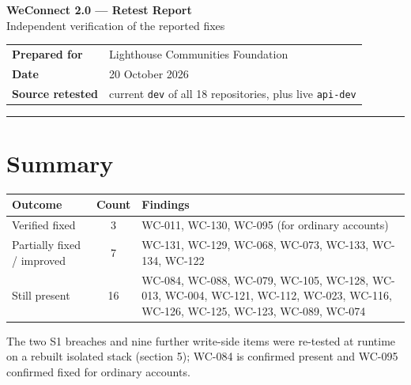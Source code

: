 \documentclass[11pt]{article}
\newcommand{\wc}[1]{\mbox{WC-#1}}
\begin{document}
\justifying

\begin{center}
{\LARGE\bfseries WeConnect 2.0 --- Retest Report}\\[4pt]
{\large Independent verification of the reported fixes}\\[10pt]
\end{center}

\begin{tabular}{@{}ll@{}}
\textbf{Prepared for} & Lighthouse Communities Foundation \\
\textbf{Date} & 20 October 2026 \\
\textbf{Source retested} & current \texttt{dev} of all 18 repositories, plus live \texttt{api-dev} \\
\end{tabular}

\vspace{3pt}\hrule\vspace{2pt}

\section{Summary}
\begin{tabularx}{\textwidth}{@{}lcL@{}}
\toprule
\textbf{Outcome} & \textbf{Count} & \textbf{Findings} \\
\midrule
Verified fixed & 3 & \wc{011}, \wc{130}, \wc{095} (for ordinary accounts) \\
Partially fixed / improved & 7 & \wc{131}, \wc{129}, \wc{068}, \wc{073}, \wc{133}, \wc{134}, \wc{122} \\
Still present & 16 & \wc{084}, \wc{088}, \wc{079}, \wc{105}, \wc{128}, \wc{013}, \wc{004}, \wc{121}, \wc{112}, \wc{023}, \wc{116}, \wc{126}, \wc{125}, \wc{123}, \wc{089}, \wc{074} \\
\bottomrule
\end{tabularx}

\vspace{2pt}
The two S1 breaches and nine further write-side items were re-tested at runtime on a rebuilt
isolated stack (section 5); \wc{084} is confirmed present and \wc{095} confirmed fixed for ordinary
accounts.
\end{document}
